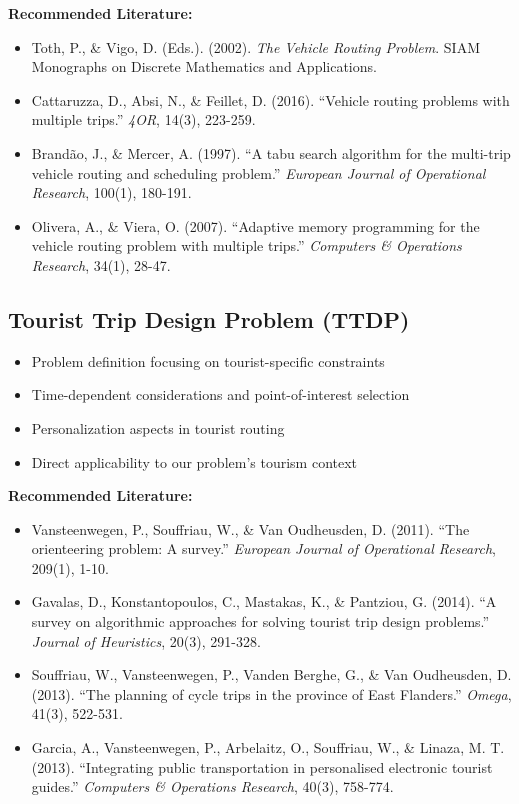 \noindent\textbf{Recommended Literature:}
\begin{itemize}
    \item Toth, P., \& Vigo, D. (Eds.). (2002). \textit{The Vehicle Routing Problem}. SIAM Monographs on Discrete Mathematics and Applications.
    \item Cattaruzza, D., Absi, N., \& Feillet, D. (2016). ``Vehicle routing problems with multiple trips.'' \textit{4OR}, 14(3), 223-259.
    \item Brandão, J., \& Mercer, A. (1997). ``A tabu search algorithm for the multi-trip vehicle routing and scheduling problem.'' \textit{European Journal of Operational Research}, 100(1), 180-191.
    \item Olivera, A., \& Viera, O. (2007). ``Adaptive memory programming for the vehicle routing problem with multiple trips.'' \textit{Computers \& Operations Research}, 34(1), 28-47.
\end{itemize}

\subsection{Tourist Trip Design Problem (TTDP)}
\begin{itemize}
    \item Problem definition focusing on tourist-specific constraints
    \item Time-dependent considerations and point-of-interest selection
    \item Personalization aspects in tourist routing
    \item Direct applicability to our problem's tourism context
\end{itemize}

\noindent\textbf{Recommended Literature:}
\begin{itemize}
    \item Vansteenwegen, P., Souffriau, W., \& Van Oudheusden, D. (2011). ``The orienteering problem: A survey.'' \textit{European Journal of Operational Research}, 209(1), 1-10.
    \item Gavalas, D., Konstantopoulos, C., Mastakas, K., \& Pantziou, G. (2014). ``A survey on algorithmic approaches for solving tourist trip design problems.'' \textit{Journal of Heuristics}, 20(3), 291-328.
    \item Souffriau, W., Vansteenwegen, P., Vanden Berghe, G., \& Van Oudheusden, D. (2013). ``The planning of cycle trips in the province of East Flanders.'' \textit{Omega}, 41(3), 522-531.
    \item Garcia, A., Vansteenwegen, P., Arbelaitz, O., Souffriau, W., \& Linaza, M. T. (2013). ``Integrating public transportation in personalised electronic tourist guides.'' \textit{Computers \& Operations Research}, 40(3), 758-774.
\end{itemize}

